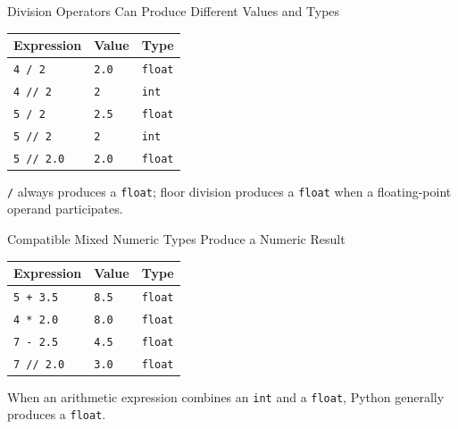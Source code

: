 \documentclass[aspectratio=169,10pt]{beamer}
\begin{document}
\begin{frame}{Division Operators Can Produce Different Values and Types}

  \begin{center}

    \begin{tabular}{l l l}
      \textbf{Expression} & \textbf{Value} & \textbf{Type} \\
      \hline
      \texttt{4 / 2} & \texttt{2.0} & \texttt{float} \\
      \texttt{4 // 2} & \texttt{2} & \texttt{int} \\
      \texttt{5 / 2} & \texttt{2.5} & \texttt{float} \\
      \texttt{5 // 2} & \texttt{2} & \texttt{int} \\
      \texttt{5 // 2.0} & \texttt{2.0} & \texttt{float} \\
    \end{tabular}

  \end{center}

  \begin{keyidea}

    \texttt{/} always produces a \texttt{float}; floor division produces a \texttt{float} when a floating-point operand participates.

  \end{keyidea}

\end{frame}

\begin{frame}{Compatible Mixed Numeric Types Produce a Numeric Result}

  \begin{center}

    \begin{tabular}{l l l}
      \textbf{Expression} & \textbf{Value} & \textbf{Type} \\
      \hline
      \texttt{5 + 3.5} & \texttt{8.5} & \texttt{float} \\
      \texttt{4 * 2.0} & \texttt{8.0} & \texttt{float} \\
      \texttt{7 - 2.5} & \texttt{4.5} & \texttt{float} \\
      \texttt{7 // 2.0} & \texttt{3.0} & \texttt{float} \\
    \end{tabular}

  \end{center}

  \begin{exampleblockcp}

    When an arithmetic expression combines an \texttt{int} and a \texttt{float}, Python generally produces a \texttt{float}.

  \end{exampleblockcp}

\end{frame}
\end{document}
